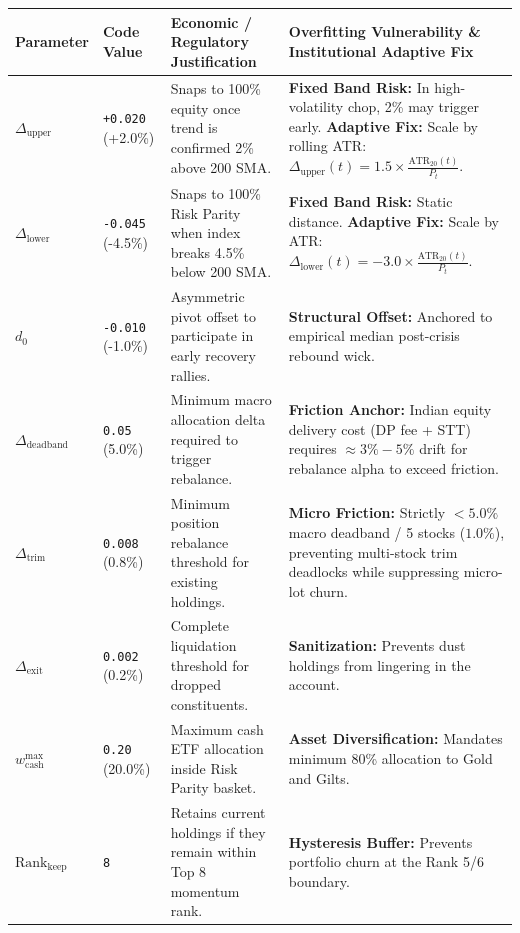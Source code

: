 \documentclass[11pt,a4paper]{article}
\begin{document}
\begin{table}[H]
\centering
\scriptsize
\begin{tabularx}{\textwidth}{llp{3.8cm}X}
\toprule
\textbf{Parameter} & \textbf{Code Value} & \textbf{Economic / Regulatory Justification} & \textbf{Overfitting Vulnerability \& Institutional Adaptive Fix} \\
\midrule
$\Delta_{\text{upper}}$ & \texttt{+0.020} (+2.0\%) & Snaps to 100\% equity once trend is confirmed 2\% above 200 SMA. & \textbf{Fixed Band Risk:} In high-volatility chop, 2\% may trigger early. \newline \textbf{Adaptive Fix:} Scale by rolling ATR: $\Delta_{\text{upper}}(t) = 1.5 \times \frac{\text{ATR}_{20}(t)}{P_t}$. \\
\addlinespace
$\Delta_{\text{lower}}$ & \texttt{-0.045} (-4.5\%) & Snaps to 100\% Risk Parity when index breaks 4.5\% below 200 SMA. & \textbf{Fixed Band Risk:} Static distance. \newline \textbf{Adaptive Fix:} Scale by ATR: $\Delta_{\text{lower}}(t) = -3.0 \times \frac{\text{ATR}_{20}(t)}{P_t}$. \\
\addlinespace
$d_0$ & \texttt{-0.010} (-1.0\%) & Asymmetric pivot offset to participate in early recovery rallies. & \textbf{Structural Offset:} Anchored to empirical median post-crisis rebound wick. \\
\addlinespace
$\Delta_{\text{deadband}}$ & \texttt{0.05} (5.0\%) & Minimum macro allocation delta required to trigger rebalance. & \textbf{Friction Anchor:} Indian equity delivery cost (DP fee + STT) requires $\approx 3\%-5\%$ drift for rebalance alpha to exceed friction. \\
\addlinespace
$\Delta_{\text{trim}}$ & \texttt{0.008} (0.8\%) & Minimum position rebalance threshold for existing holdings. & \textbf{Micro Friction:} Strictly $< 5.0\%$ macro deadband / 5 stocks ($1.0\%$), preventing multi-stock trim deadlocks while suppressing micro-lot churn. \\
\addlinespace
$\Delta_{\text{exit}}$ & \texttt{0.002} (0.2\%) & Complete liquidation threshold for dropped constituents. & \textbf{Sanitization:} Prevents dust holdings from lingering in the account. \\
\addlinespace
$w_{\text{cash}}^{\max}$ & \texttt{0.20} (20.0\%) & Maximum cash ETF allocation inside Risk Parity basket. & \textbf{Asset Diversification:} Mandates minimum 80\% allocation to Gold and Gilts. \\
\addlinespace
$\text{Rank}_{\text{keep}}$ & \texttt{8} & Retains current holdings if they remain within Top 8 momentum rank. & \textbf{Hysteresis Buffer:} Prevents portfolio churn at the Rank 5/6 boundary. \\

\end{tabularx}
\end{table}
\end{document}
